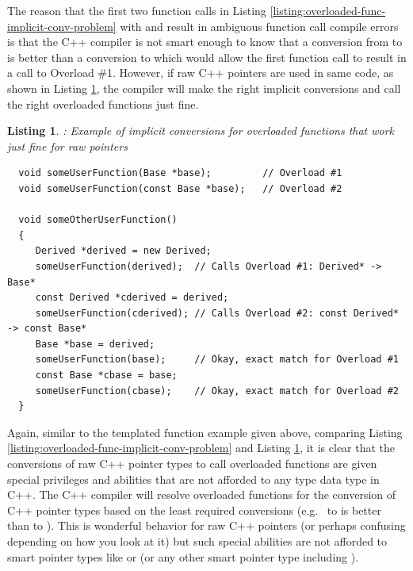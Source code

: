 \documentclass[pdf,ps2pdf,11pt]{SANDreport}
\newtheorem{listing}{Listing}
\begin{document}
The reason that the first two function calls in Listing
{}\ref{listing:overloaded-func-implicit-conv-problem} with
{} and {} result in
ambiguous function call compile errors is that the C++ compiler is not
smart enough to know that a conversion from {} to
{} is better than a conversion to {} which would allow the first function call to result in a call
to Overload \#1.  However, if raw C++ pointers are used in same code,
as shown in Listing
{}\ref{listing:overloaded-func-implicit-conv-raw-pass}, the compiler
will make the right implicit conversions and call the right overloaded
functions just fine.


{}\begin{listing}: Example of implicit conversions for overloaded
functions that work just fine for raw pointers
\label{listing:overloaded-func-implicit-conv-raw-pass}
{\small\begin{verbatim}
  void someUserFunction(Base *base);         // Overload #1
  void someUserFunction(const Base *base);   // Overload #2

  void someOtherUserFunction()
  {
     Derived *derived = new Derived;
     someUserFunction(derived);  // Calls Overload #1: Derived* -> Base*
     const Derived *cderived = derived;
     someUserFunction(cderived); // Calls Overload #2: const Derived* -> const Base*
     Base *base = derived;
     someUserFunction(base);     // Okay, exact match for Overload #1
     const Base *cbase = base;
     someUserFunction(cbase);    // Okay, exact match for Overload #2
  }
\end{verbatim}}
\end{listing}


Again, similar to the templated function example given above,
comparing Listing
{}\ref{listing:overloaded-func-implicit-conv-problem} and Listing
{}\ref{listing:overloaded-func-implicit-conv-raw-pass}, it is clear
that the conversions of raw C++ pointer types to call overloaded
functions are given special privileges and abilities that are not
afforded to any type data type in C++.  The C++ compiler will resolve
overloaded functions for the conversion of C++ pointer types based on
the least required conversions (e.g.\ {} to
{} is better than {} to {}).
This is wonderful behavior for raw C++ pointers (or perhaps confusing
depending on how you look at it) but such special abilities are not
afforded to smart pointer types like {} or {} (or
any other smart pointer type including {}).
\end{document}
